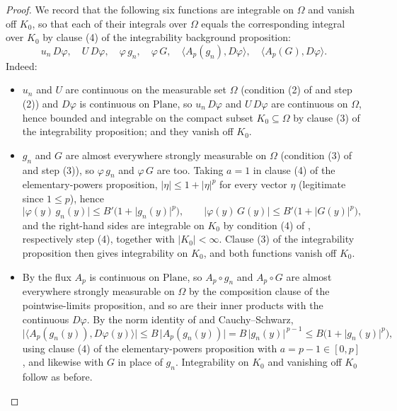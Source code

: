\begin{proof}
We record that the following six functions are integrable on $\Omega$ and vanish off $K_0$, so
that each of their integrals over $\Omega$ equals the corresponding integral over $K_0$ by
clause (4) of the integrability background proposition:
\[
  u_n\,D\varphi,\quad U\,D\varphi,\quad \varphi\,g_n,\quad \varphi\,G,\quad
  \bigl\langle A_p(g_n),D\varphi\bigr\rangle,\quad \bigl\langle A_p(G),D\varphi\bigr\rangle .
\]
Indeed:
\begin{itemize}
\item $u_n$ and $U$ are continuous on the measurable set $\Omega$ (condition (2) of
 and step (2)) and $D\varphi$ is continuous on $\mathrm{Plane}$, so
$u_n\,D\varphi$ and $U\,D\varphi$ are continuous on $\Omega$, hence bounded and integrable on
the compact subset $K_0\subseteq\Omega$ by clause (3) of the integrability proposition; and they
vanish off $K_0$.
\item $g_n$ and $G$ are almost everywhere strongly measurable on $\Omega$ (condition (3) of
 and step (3)), so $\varphi\,g_n$ and $\varphi\,G$ are too.  Taking $a=1$ in
clause (4) of the elementary-powers proposition, $\lvert\eta\rvert\le1+\lvert\eta\rvert^{p}$
for every vector $\eta$ (legitimate since $1\le p$), hence
\[
  \lvert\varphi(y)\,g_n(y)\rvert\le B'\bigl(1+\lvert g_n(y)\rvert^{p}\bigr),\qquad
  \lvert\varphi(y)\,G(y)\rvert\le B'\bigl(1+\lvert G(y)\rvert^{p}\bigr),
\]
and the right-hand sides are integrable on $K_0$ by condition (4) of ,
respectively step (4), together with $\lvert K_0\rvert<\infty$.  Clause (3) of the integrability
proposition then gives integrability on $K_0$, and both functions vanish off $K_0$.
\item By  the flux $A_p$ is continuous on $\mathrm{Plane}$, so
$A_p\circ g_n$ and $A_p\circ G$ are almost everywhere strongly measurable on $\Omega$ by the
composition clause of the pointwise-limits proposition, and so are their inner products with the
continuous $D\varphi$.  By the norm identity of  and Cauchy--Schwarz,
\[
  \bigl\lvert\bigl\langle A_p(g_n(y)),D\varphi(y)\bigr\rangle\bigr\rvert
  \le B\,\lvert A_p(g_n(y))\rvert=B\,\lvert g_n(y)\rvert^{\,p-1}
  \le B\bigl(1+\lvert g_n(y)\rvert^{p}\bigr),
\]
using clause (4) of the elementary-powers proposition with $a=p-1\in[0,p]$, and likewise with
$G$ in place of $g_n$.  Integrability on $K_0$ and vanishing off $K_0$ follow as before.
\end{itemize}


\end{proof}
